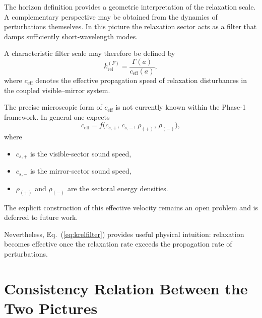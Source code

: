 \documentclass[11pt,a4paper]{article}
\begin{document}
The horizon definition provides a geometric interpretation of the relaxation
scale. A complementary perspective may be obtained from the dynamics of
perturbations themselves. In this picture the relaxation sector acts as a
filter that damps sufficiently short-wavelength modes.

A characteristic filter scale may therefore be defined by
\begin{equation}
  k_{\mathrm{rel}}^{(F)}
  =
  \frac{\Gamma(a)}{c_{\mathrm{eff}}(a)},
  \label{eq:krelfilter}
\end{equation}
where \(c_{\mathrm{eff}}\) denotes the effective propagation speed of
relaxation disturbances in the coupled visible--mirror system.

The precise microscopic form of \(c_{\mathrm{eff}}\) is not currently known
within the Phase-1 framework. In general one expects
\begin{equation}
  c_{\mathrm{eff}}
  =
  f
  \big(
    c_{s,+},\,
    c_{s,-},\,
    \rho_{(+)},\,
    \rho_{(-)}
  \big),
\end{equation}
where
\begin{itemize}
  \item \(c_{s,+}\) is the visible-sector sound speed,
  \item \(c_{s,-}\) is the mirror-sector sound speed,
  \item \(\rho_{(+)}\) and \(\rho_{(-)}\) are the sectoral energy densities.
\end{itemize}
The explicit construction of this effective velocity remains an open problem
and is deferred to future work.

Nevertheless, Eq.~(\ref{eq:krelfilter}) provides useful physical intuition:
relaxation becomes effective once the relaxation rate exceeds the propagation
rate of perturbations.

\section{Consistency Relation Between the Two Pictures}
\end{document}
